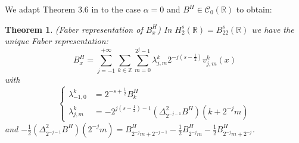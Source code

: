 \documentclass[11pt]{enstaPRE}
\newtheorem{theo}{Theorem}
\newcommand{\R}{\mathbb{R}}
\newcommand{\Z}{\mathbb{Z}}
\begin{document}
We adapt Theorem 3.6 in \cite{Tri-fab} to the case $\alpha=0$ and $B^H\in\mathcal{C}_0(\R)$ to obtain:

\begin{theo}(Faber representation of $B^H_x$)
    In $H^s_2(\R)=B^s_{22}(\R)$ we have the unique Faber representation:
    \begin{equation}
    B^H_x = \sum_{j=-1}^{+\infty}\sum_{k\in\Z}\sum_{m=0}^{2^j-1}\lambda_{j,m}^k2^{-j\left(s-\frac{1}{2}\right)}v_{j,m}^k(x)
    \end{equation}    
    with \begin{equation}
    \begin{cases}
    \lambda^k_{-1,0} & = 2^{-s+\frac{1}{2}}B^H_k\\
    \lambda^k_{j,m} & = -2^{j(s-\frac{1}{2})-1} (\Delta^2_{2^{-j-1}}B^H)(k+2^{-j}m)
    \end{cases}
    \end{equation}
    and $-\frac{1}{2}(\Delta^2_{2^{-j-1}}B^H)(2^{-j}m) = B^H_{2^{-j}m+2^{-j-1}}-\frac{1}{2}B^H_{2^{-j}m}-\frac{1}{2}B^H_{2^{-j}m+2^{-j}}$.
\end{theo}
\end{document}
